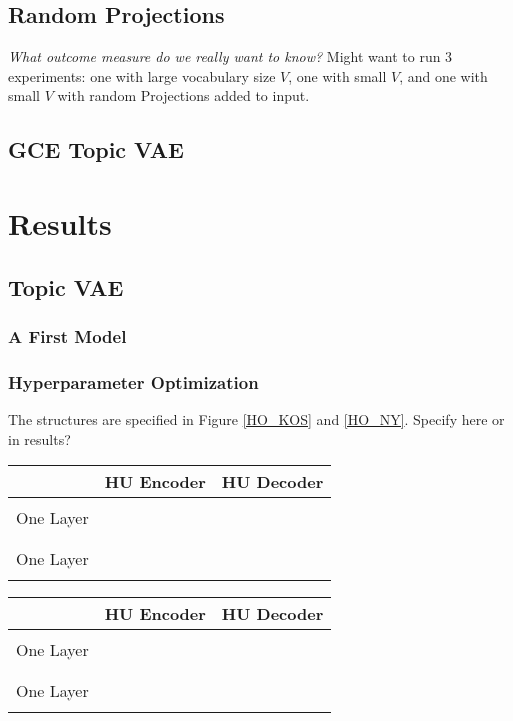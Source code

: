 \documentclass{report}
\begin{document}
	\subsection{Random Projections}
	\textit{What outcome measure do we really want to know?} 
	 Might want to run 3 experiments: one with large vocabulary size $V$, one with small $V$, and one with small $V$ with random Projections added to input. 
	
	\subsection{GCE Topic VAE}
	
	\section{Results}
	
	\subsection{Topic VAE}
	
	\subsubsection{A First Model}
	
	\subsubsection{Hyperparameter Optimization}
	
	The structures are specified in Figure \ref{HO_KOS} and \ref{HO_NY}. Specify here or in results?
	
	
	\begin{tabular}{l||l|l|}\label{HO_KOS}
		& HU Encoder & HU Decoder   	\\
		\hline
		& 			& 			\\
		\cline{2-3} 
		One Layer 		& 			& 			\\
		\cline{2-3}
		& 			& 			\\
		\hline	
		& 			&  			\\
		\cline{2-3} 
		One Layer 		& 			& 			\\
		\cline{2-3}
		& 			& 			\\
		\hline
	\end{tabular}
	
	
	\begin{tabular}{l||l|l|}\label{HO_NY}
		& HU Encoder & HU Decoder   	\\
		\hline
		& 			& 			\\
		\cline{2-3} 
		One Layer 		& 			& 			\\
		\cline{2-3}
		& 			& 			\\
		\hline	
		& 			&  			\\
		\cline{2-3} 
		One Layer 		& 			& 			\\
		\cline{2-3}
		& 			& 			\\
		\hline
	\end{tabular}
\end{document}
